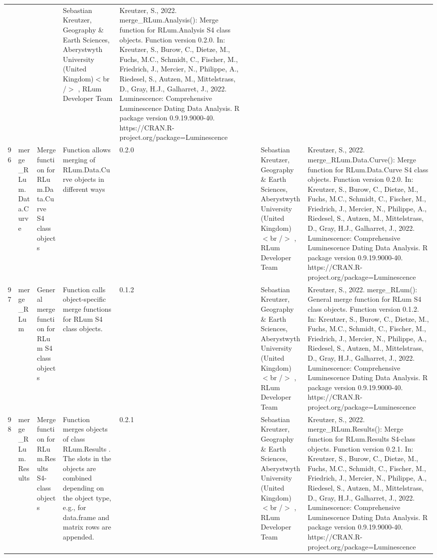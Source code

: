 \begin{table}[ht]
\begin{tabular}{rllllllll}
 &  &  & Sebastian Kreutzer, Geography \& Earth Sciences, Aberystwyth University (United Kingdom)$<$br /$>$ , RLum Developer Team & Kreutzer, S., 2022. merge\_RLum.Analysis(): Merge function for RLum.Analysis S4 class objects. Function version 0.2.0. In: Kreutzer, S., Burow, C., Dietze, M., Fuchs, M.C., Schmidt, C., Fischer, M., Friedrich, J., Mercier, N., Philippe, A., Riedesel, S., Autzen, M., Mittelstrass, D., Gray, H.J., Galharret, J., 2022. Luminescence: Comprehensive Luminescence Dating Data Analysis. R package version 0.9.19.9000-40. https://CRAN.R-project.org/package=Luminescence
 \\ 
  96 & merge\_RLum.Data.Curve & Merge function for RLum.Data.Curve S4 class objects & Function allows merging of RLum.Data.Curve objects in different ways & 0.2.0
 &  &  & Sebastian Kreutzer, Geography \& Earth Sciences, Aberystwyth University (United Kingdom)$<$br /$>$ , RLum Developer Team & Kreutzer, S., 2022. merge\_RLum.Data.Curve(): Merge function for RLum.Data.Curve S4 class objects. Function version 0.2.0. In: Kreutzer, S., Burow, C., Dietze, M., Fuchs, M.C., Schmidt, C., Fischer, M., Friedrich, J., Mercier, N., Philippe, A., Riedesel, S., Autzen, M., Mittelstrass, D., Gray, H.J., Galharret, J., 2022. Luminescence: Comprehensive Luminescence Dating Data Analysis. R package version 0.9.19.9000-40. https://CRAN.R-project.org/package=Luminescence
 \\ 
  97 & merge\_RLum & General merge function for RLum S4 class objects & Function calls object-specific merge functions for RLum S4 class objects. & 0.1.2
 &  &  & Sebastian Kreutzer, Geography \& Earth Sciences, Aberystwyth University (United Kingdom)$<$br /$>$ , RLum Developer Team & Kreutzer, S., 2022. merge\_RLum(): General merge function for RLum S4 class objects. Function version 0.1.2. In: Kreutzer, S., Burow, C., Dietze, M., Fuchs, M.C., Schmidt, C., Fischer, M., Friedrich, J., Mercier, N., Philippe, A., Riedesel, S., Autzen, M., Mittelstrass, D., Gray, H.J., Galharret, J., 2022. Luminescence: Comprehensive Luminescence Dating Data Analysis. R package version 0.9.19.9000-40. https://CRAN.R-project.org/package=Luminescence
 \\ 
  98 & merge\_RLum.Results & Merge function for RLum.Results S4-class objects & Function merges objects of class  RLum.Results . The slots in the objects are combined depending on the object type, e.g., for  data.frame  and  matrix  rows are appended. & 0.2.1
 &  &  & Sebastian Kreutzer, Geography \& Earth Sciences, Aberystwyth University (United Kingdom)$<$br /$>$ , RLum Developer Team & Kreutzer, S., 2022. merge\_RLum.Results(): Merge function for RLum.Results S4-class objects. Function version 0.2.1. In: Kreutzer, S., Burow, C., Dietze, M., Fuchs, M.C., Schmidt, C., Fischer, M., Friedrich, J., Mercier, N., Philippe, A., Riedesel, S., Autzen, M., Mittelstrass, D., Gray, H.J., Galharret, J., 2022. Luminescence: Comprehensive Luminescence Dating Data Analysis. R package version 0.9.19.9000-40. https://CRAN.R-project.org/package=Luminescence

\end{tabular}
\end{table}
